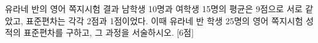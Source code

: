 유라네 반의 영어 쪽지시험 결과 남학생 10명과 여학생 15명의 평균은 9점으로 서로 같았고, 표준편차는 각각 2점과 1점이었다. 이때 유라네 반 학생 25명의 영어 쪽지시험 성적의 표준편차를 구하고, 그 과정을 서술하시오. \mbox{[6점]}
